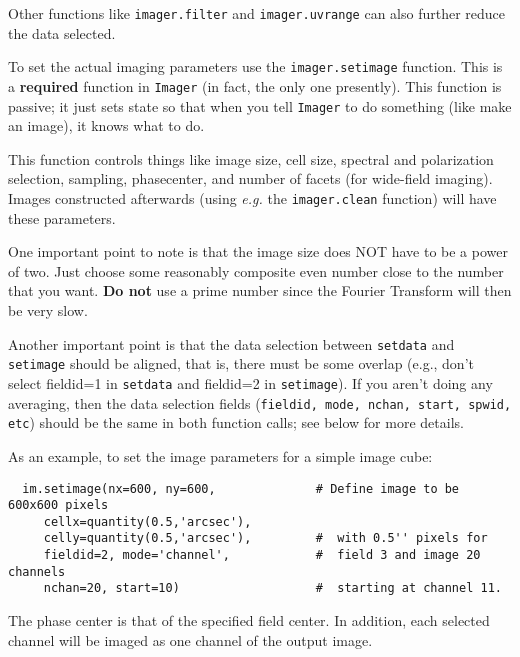 Other functions like {\tt imager.filter} and {\tt imager.uvrange} can
also further reduce the data selected.

\vspace{3mm}

To set the actual imaging parameters use the {\tt imager.setimage}
function.  This is a {\bf required} function in {\tt Imager} (in fact,
the only one presently).  This function is passive; it just sets state
so that when you tell {\tt Imager} to do something (like make an
image), it knows what to do.

This function controls things like image size, cell size, spectral and
polarization selection, sampling, phasecenter, and number of facets
(for wide-field imaging).  Images constructed afterwards (using {\em
e.g.} the {\tt imager.clean} function) will have these parameters.

One important point to note is that the image size does NOT have to be
a power of two.  Just choose some reasonably composite even number
close to the number that you want.  {\bf Do not} use a prime number
since the Fourier Transform will then be very slow.

Another important point is that the data selection between {\tt setdata}
and {\tt setimage} should be aligned, that is, there must be some overlap
(e.g., don't select fieldid=1 in {\tt setdata} and fieldid=2 in {\tt setimage}).
If you aren't doing any averaging, then the data selection fields
({\tt fieldid, mode, nchan, start, spwid, etc}) should be the same in both
function calls; see below for more details.

As an example, to set the image parameters for a simple image cube:

\small
\begin{verbatim}
  im.setimage(nx=600, ny=600,              # Define image to be 600x600 pixels
     cellx=quantity(0.5,'arcsec'),
     celly=quantity(0.5,'arcsec'),         #  with 0.5'' pixels for
     fieldid=2, mode='channel',            #  field 3 and image 20 channels
     nchan=20, start=10)                   #  starting at channel 11.
\end{verbatim}
\normalsize

The phase center is that of the specified field center. In addition,
each selected channel will be imaged as one channel of the output
image.

\vspace{3mm}

